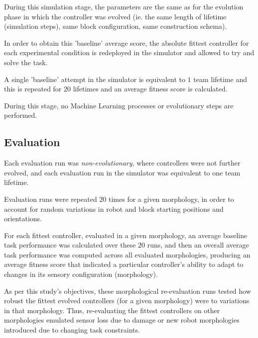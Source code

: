 During this simulation stage, the parameters are the same as for the evolution phase in which the controller was evolved (ie. the same length of lifetime (simulation steps), same block configuration, same construction schema).

In order to obtain this 'baseline' average score, the absolute fittest controller for each experimental condition is redeployed in the simulator and allowed to try and solve the task. 

A single 'baseline' attempt in the simulator is equivalent to $1$ team lifetime and this is repeated for $20$ lifetimes and an average fitness score is calculated.

During this stage, no Machine Learning processes or evolutionary steps are performed.

\subsection{Evaluation}

Each evaluation run was \textit{non-evolutionary}, where controllers were not further evolved,
and each evaluation run in the simulator was equivalent to one team lifetime.

Evaluation runs were repeated $20$ times for a given morphology, in order to account for random variations in robot and block
starting positions and orientations.

For each fittest controller, evaluated in a given morphology, an average baseline task performance was
calculated over these $20$ runs, and then an overall average task performance was computed across all evaluated morphologies, producing an average fitness score that indicated a particular controller's ability to adapt to changes in its sensory configuration (morphology).

As per this study's objectives, these morphological re-evaluation
runs tested how robust the fittest evolved controllers (for a given morphology) were to variations
in that morphology.
Thus, re-evaluating the fittest controllers on other morphologies emulated sensor loss due
to damage or new robot morphologies introduced due to changing task constraints.



